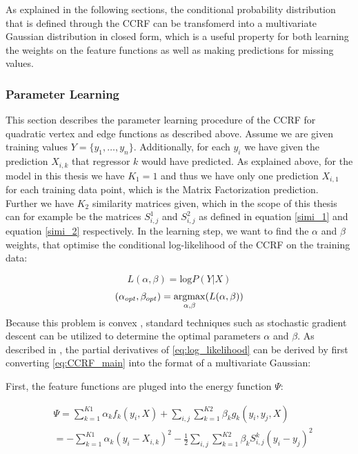As explained in the following sections, the conditional probability distribution that is defined through the CCRF can be transfomerd into a multivariate Gaussian distribution in closed form, which is a useful property for both learning the weights on the feature functions as well as making predictions for missing values.
\subsubsection{Parameter Learning}

This section describes the parameter learning procedure of the CCRF for quadratic vertex and edge functions as described above. Assume we are given training values $Y=\{y_1,\dots,y_n\}$. Additionally, for each $y_i$ we have given the prediction $X_{i,k}$ that regressor $k$ would have predicted. As explained above, for the model in this thesis we have $K_1=1$ and thus we have only one prediction $X_{i,1}$ for each training data point, which is the Matrix Factorization prediction. Further we have $K_2$ similarity matrices given, which in the scope of this thesis can for example be the matrices $S_{i,j}^1$ and $S_{i,j}^2$ as defined in equation \ref{simi_1} and equation \ref{simi_2} respectively. In the learning step, we want to find the $\alpha$ and $\beta$ weights, that optimise the conditional log-likelihood of the CCRF on the training data:

\begin{equation}  
\label{eq:log_likelihood}
L(\alpha,\beta)=\text{log}P(Y|X)
\end{equation}
\begin{equation}  
(\alpha_{opt}, \beta_{opt}) = \operatorname*{argmax}_{\alpha, \beta}(L(\alpha,\beta))
\end{equation}
Because this problem is convex \cite{qin2009global}, standard techniques such as stochastic gradient descent can be utilized to determine the optimal parameters $\alpha$ and $\beta$. As described in \cite{baltruvsaitis2013dimensional}, the partial derivatives of \ref{eq:log_likelihood} can be derived by first converting \ref{eq:CCRF_main} into the format of a multivariate Gaussian:

First, the feature functions are pluged into the energy function $\Psi$:

\begin{equation}
\label{learning:Psi}
\begin{split}
& \Psi = \sum\limits_{k=1}^{K1} \alpha_k f_k(y_i, X) + \sum_{i,j} \sum \limits_{k=1}^{K2} \beta_k g_k (y_i, y_j,X) \\
& = -\sum\limits_{k=1}^{K1} \alpha_k (y_i - X_{i,k})^2 - \frac{1}{2} \sum_{i,j} \sum \limits_{k=1}^{K2} \beta_k S_{i,j}^k(y_i-y_j)^2
\end{split}
\end{equation}

